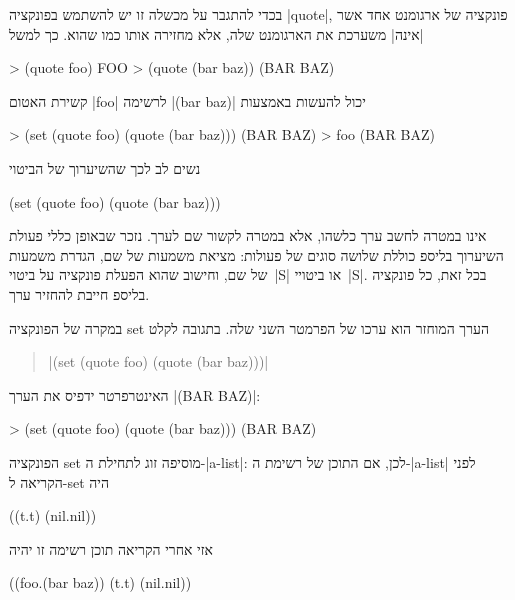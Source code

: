 בכדי להתגבר על מכשלה זו יש להשתמש בפונקציה \T|quote|, פונקציה של ארגומנט אחד
אשר \ע|אינה| משערכת את הארגומנט שלה, אלא מחזירה אותו כמו שהוא.
כך למשל
\begin{LISP}
> (quote foo)
FOO
> (quote (bar baz))
(BAR BAZ)
\end{LISP}
קשירת האטום \T|foo| לרשימה \T|(bar baz)| יכול להעשות באמצעות
\begin{LISP}
> (set (quote foo) (quote (bar baz)))
(BAR BAZ)
> foo
(BAR BAZ)
\end{LISP}
נשים לב לכך שהשיערוך של הביטוי
\begin{LISP}
(set (quote foo) (quote (bar baz)))
\end{LISP}
אינו במטרה לחשב ערך כלשהו, אלא במטרה לקשור שם לערך. נזכר שבאופן כללי פעולת
השיערוך בליספ כוללת שלושה סוגים של פעולות: מציאת משמעות של שם, הגדרת משמעות של
שם, וחישוב שהוא הפעלת פונקציה על ביטוי~\E|S| או ביטויי~\E|S|. בכל זאת, כל
פונקציה בליספ חייבת להחזיר ערך.

במקרה של הפונקציה set הערך המוחזר הוא ערכו של הפרמטר השני שלה. בתגובה לקלט
\begin{quote}
\T|(set (quote foo) (quote (bar baz)))|
\end{quote}
האינטרפרטר ידפיס את הערך \T|(BAR BAZ)|:
\begin{LISP}
> (set (quote foo) (quote (bar baz)))
(BAR BAZ)
\end{LISP}

הפונקציה set מוסיפה זוג לתחילת ה-\E|a-list|: לכן, אם התוכן של רשימת
ה-\E|a-list| לפני הקריאה ל-set היה
\begin{LISP}
((t.t)
     (nil.nil))
\end{LISP}

\pagebreak[3]
אזי אחרי הקריאה תוכן רשימה זו יהיה
\begin{LISP}
((foo.(bar baz))
     (t.t)
     (nil.nil))
\end{LISP}

